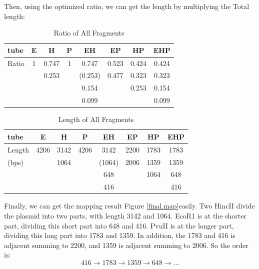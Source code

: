 \documentclass{article}
\begin{document}
            Then, using the optimized ratio, we can get the length by multiplying the Total length:
            \begin{table}[H]
                \caption{Ratio of All Fragments}
                \centering
                \begin{tabular}{|l|c|c|c|c|c|c|c|}
                    \hline
                    tube&E&H&P&EH&EP&HP&EHP\\
                    \hline
                    Ratio&1&0.747&1&0.747&0.523&0.424&0.424\\
                    &&0.253&&(0.253)&0.477&0.323&0.323\\
                    &&&&0.154&&0.253&0.154\\
                    &&&&0.099&&&0.099\\
                    \hline
                \end{tabular}
                \label{data.ratio.final}
            \end{table}
            \begin{table}[H]
                \caption{Length of All Fragments}
                \centering
                \begin{tabular}{|l|c|c|c|c|c|c|c|}
                    \hline
                    tube&E&H&P&EH&EP&HP&EHP\\
                    \hline
                    Length&4206&3142&4206&3142&2200&1783&1783\\
                    (bps)&&1064&&(1064)&2006&1359&1359\\
                    &&&&648&&1064&648\\
                    &&&&416&&&416\\
                    \hline
                \end{tabular}
                \label{data.length.final}
            \end{table}

            Finally, we can get the mapping result Figure \ref{final.map}easily. Two HincII divide the plasmid into two parts, with length 3142 and 1064. EcoR1 is at the shorter part, dividing this short part into 648 and 416. PvuII is at the longer part, dividing this long part into 1783 and 1359. In addition, the 1783 and 416 is adjacent summing to 2200, and 1359 is adjacent summing to 2006. So the order is:
            $$416\rightarrow1783\rightarrow1359\rightarrow648\rightarrow...$$
\end{document}
